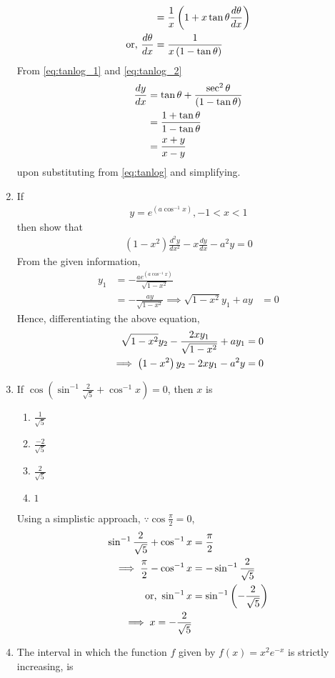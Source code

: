 \documentclass[journal,12pt,twocolumn]{IEEEtran}
\renewcommand\thesection{\arabic{section}}
\begin{document}
\begin{enumerate}[label=\thesection.\arabic*.,ref=\thesection.\theenumi]
\begin{align}
			&= \frac{1}{x}\left(1 + x \tan \theta \frac{d\theta}{dx}\right)
			\\
			\text{or, } \frac{d\theta}{dx} &= \frac{1}{x\left(1 - \tan \theta\right)}
\label{eq:tanlog_2}
		\end{align}
From \eqref{eq:tanlog_1} and 
\eqref{eq:tanlog_2}
		\begin{align}
			\frac{dy}{dx} &= \tan \theta +  \frac{\sec^2 \theta}{\left(1 - \tan \theta\right)}
			\\
			&= \frac{1 + \tan \theta}{{1 - \tan \theta}}
			\\
			&= \frac{x + y}{x-y}
		\end{align}
upon substituting from \eqref{eq:tanlog} and simplifying.

\item If  \begin{align} y=e^{(a\cos^{-1}x)}  , -1 < x < 1 \nonumber \end{align}  then show that  \begin{align} (1-x^2) \frac{d^2y}{dx^2} - x \frac{dy}{dx} - a^2y =0 \nonumber \end{align}
		\solution From the given information, 
		\begin{align}
			y_1 &= -\frac{ae^{(a\cos^{-1}x)}}{\sqrt{1-x^2}}
			\\
			&= -\frac{ay}{\sqrt{1-x^2}}
			\implies \sqrt{1-x^2}y_1 + ay &= 0
		\end{align}
		Hence,  differentiating the above equation, 
		\begin{align}
			\sqrt{1-x^2 }	y_2 - \frac{2xy_1}{\sqrt{1-x^2}} + ay_1 &= 0
			\\
			\implies 
			\left(1-x^2 \right)	y_2 - 2xy_1 - a^2y &= 0
		\end{align}

\item If $\cos (\sin^{-1} \frac{2}{\sqrt 5} + \cos^{-1} x) = 0$, then $x$ is  

\begin{enumerate}
   \item $\frac{1}{\sqrt5}$\\
   \item $ \frac{-2}{\sqrt5}$\\
    \item $ \frac{2}{\sqrt5}$\\
    \item $1$
\end{enumerate}
		\solution  Using a simplistic approach,  $\because \cos \frac{\pi}{2} = 0$,
		\begin{align}
			\sin^{-1} \frac{2}{\sqrt 5} + \cos^{-1} x &= \frac{\pi}{2}
			\\
			\implies \frac{\pi}{2} -\cos^{-1}x &= - \sin^{-1} \frac{2}{\sqrt 5} 
			\\
			\text{or, }\sin^{-1}x &=  \sin^{-1} \left(-\frac{2}{\sqrt 5}   \right)
			\\
			\implies x = -\frac{2}{\sqrt 5}   
		\end{align}
\item The interval in which the function $f$ given by $ f({x}) = x^2e^{-x} $ is strictly increasing,  is


\end{enumerate}
\end{document}
